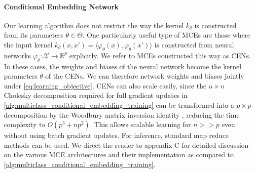 \documentclass{llncs}
\begin{document}
	\paragraph{Conditional Embedding Network} Our learning algorithm does not restrict the way the kernel $k_{\theta}$ is constructed from its parameters $\theta \in \Theta$. One particularly useful type of \glspl{MCE} are those where the input kernel $k_{\theta}(x, x') = \langle \varphi_{\theta}(x), \varphi_{\theta}(x') \rangle$ is constructed from neural networks $\varphi_{\theta} : \mathcal{X} \to \mathbb{R}^{p}$ explicitly. We refer to \glspl{MCE} constructed this way as \glspl{CEN}. In these cases, the weights and biases of the neural network become the kernel parameters $\theta$ of the \glspl{CEN}. We can therefore network weights and biases jointly under \eqref{eq:learning_objective}. \glspl{CEN} can also scale easily, since the $n \times n$ Cholesky decomposition required for full gradient updates in \cref{alg:multiclass_conditional_embedding_training} can be transformed into a $p \times p$ decomposition by the Woodbury matrix inversion identity \citep{higham2002accuracy}, reducing the time complexity to $O(p^{3} + np^{2})$. This allows scalable learning for $n >> p$ even without using batch gradient updates. For inference, standard map reduce methods can be used. We direct the reader to appendix C for detailed discussion on the various \gls{MCE} architectures and their implementation as compared to \cref{alg:multiclass_conditional_embedding_training}. 
	
	
\end{document}
